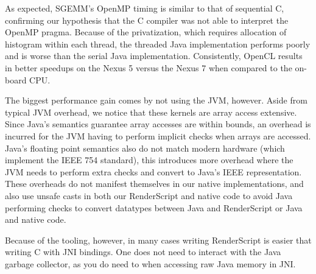 As expected, SGEMM's OpenMP timing is similar to that of sequential C, confirming our hypothesis that the C compiler was not able
  to interpret the OpenMP pragma.
Because of the privatization, which requires allocation of histogram within each thread, the threaded Java implementation performs poorly and is 
  worse than the serial Java implementation.
Consistently, OpenCL results in better speedups on the Nexus 5 versus the Nexus 7 when compared to the on-board CPU. 

The biggest performance gain comes by not using the JVM, however.
Aside from typical JVM overhead, we notice that these kernels are array access extensive.
Since Java's semantics guarantee array accesses are within bounds, an overhead is incurred for the JVM having to perform implicit checks when arrays are accessed.
Java's floating point semantics also do not match modern hardware (which implement the IEEE 754 standard),
  this introduces more overhead where the JVM needs to perform extra checks and
  convert to Java's IEEE representation.
These overheads do not manifest themselves in our native implementations, and
  also use unsafe casts in both our RenderScript and native code
  to avoid Java performing checks to convert datatypes between Java and RenderScript or Java and native code.

Because of the tooling, however, in many cases 
  writing RenderScript is easier that writing C with JNI bindings.
One does not need to interact with the Java garbage collector, as you do 
  need to when accessing raw Java memory in JNI.
